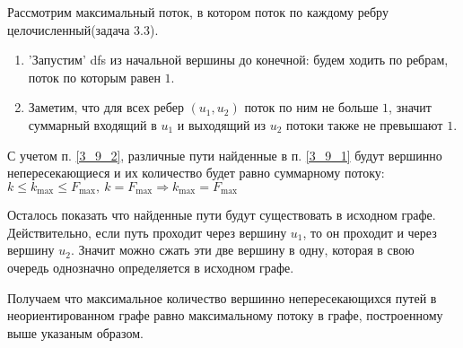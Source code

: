 \documentclass[english]{article}
\theoremstyle{plain}
\theoremstyle{remark}
\theoremstyle{definition}
\begin{document}
Рассмотрим максимальный поток, в котором поток по каждому ребру
целочисленный(задача 3.3).
\begin{enumerate}
\item \label{3_9_1}'Запустим' dfs из начальной вершины до конечной: будем
ходить по ребрам, поток по которым равен \(1\).
\item \label{3_9_2}Заметим, что для всех
ребер \((u_1, u_2)\) поток по ним не больше \(1\), значит суммарный
входящий в \(u_1\) и выходящий из \(u_2\) потоки также не превышают \(1\).
\begin{center}
\end{center}
\end{enumerate}

С учетом п. \ref{3_9_2}, различные пути найденные в п. \ref{3_9_1} будут вершинно непересекающиеся и
их количество будет равно суммарному потоку: \(k \le k_{\max} \le F_{\max},\ k = F_{\max} \Rightarrow k_{\max} = F_{\max}\)

Осталось показать что найденные пути будут существовать в исходном
графе. Действительно, если путь проходит через вершину \(u_1\), то он
проходит и через вершину \(u_2\). Значит можно сжать эти две вершину в
одну, которая в свою очередь однозначно определяется в исходном графе.

Получаем что максимальное количество вершинно непересекающихся путей в
неориентированном графе равно максимальному потоку в графе,
построенному выше указаным образом.
\end{document}
